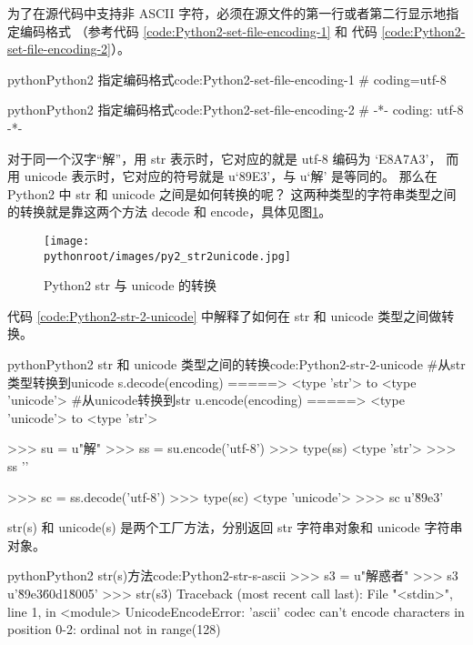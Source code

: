 为了在源代码中支持非 ASCII 字符，必须在源文件的第一行或者第二行显示地指定编码格式
（参考代码 \ref{code:Python2-set-file-encoding-1} 和 代码 \ref{code:Python2-set-file-encoding-2}）。

\begin{jcode}{python}{Python2 指定编码格式}{code:Python2-set-file-encoding-1}
# coding=utf-8
\end{jcode}

\begin{jcode}{python}{Python2 指定编码格式}{code:Python2-set-file-encoding-2}
# -*- coding: utf-8 -*-
\end{jcode}

对于同一个汉字“解”，用 str 表示时，它对应的就是 utf-8 编码为 `E8A7A3'，
而用 unicode 表示时，它对应的符号就是 u`89E3'，与 u`解' 是等同的。
那么在 Python2 中 str 和 unicode 之间是如何转换的呢？
这两种类型的字符串类型之间的转换就是靠这两个方法 decode 和 encode，具体见图\ref{fig:Python2-str-2-unicode}。

\begin{figure}[ht]
  \centering
  \texttt{[image: \\pythonroot/images/py2\_str2unicode.jpg]}
  \caption{Python2 str 与 unicode 的转换}
  \label{fig:Python2-str-2-unicode}
\end{figure}

代码 \ref{code:Python2-str-2-unicode} 中解释了如何在 str 和 unicode 类型之间做转换。

\begin{jcode}{python}{Python2 str 和 unicode 类型之间的转换}{code:Python2-str-2-unicode}
#从str类型转换到unicode
s.decode(encoding)   =====>  <type 'str'> to <type 'unicode'>
#从unicode转换到str
u.encode(encoding)   =====>  <type 'unicode'> to <type 'str'>

>>> su = u"解" 
>>> ss = su.encode('utf-8')
>>> type(ss)
<type 'str'>
>>> ss
''

>>> sc = ss.decode('utf-8')
>>> type(sc)
<type 'unicode'>
>>> sc
u'\u89e3'
\end{jcode}

str(s) 和 unicode(s) 是两个工厂方法，分别返回 str 字符串对象和 unicode 字符串对象。

\begin{jcode}{python}{Python2 str(s)方法}{code:Python2-str-s-ascii}
>>> s3 = u"解惑者"
>>> s3
u'\u89e3\u60d1\u8005'
>>> str(s3)
Traceback (most recent call last):
  File "<stdin>", line 1, in <module>
UnicodeEncodeError: 'ascii' codec can't encode characters in position 0-2:
ordinal not in range(128)
\end{jcode}

